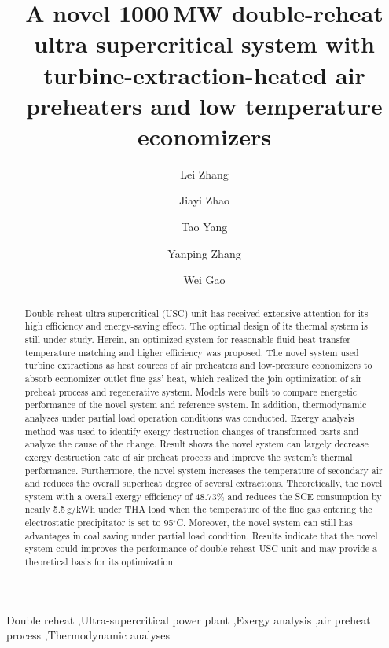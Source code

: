 \documentclass[preprint,12pt]{elsarticle}
\begin{document}
\begin{frontmatter}



\title{A novel 1000\,MW double-reheat ultra supercritical system with turbine-extraction-heated air preheaters and low temperature economizers}


\author[hust,ncst]{Lei Zhang}
\author[hust]{Jiayi Zhao}
\author[hust]{Tao Yang}
\author[hust]{Yanping Zhang}
\author[hust]{Wei Gao}


\address[hust]{School of Energy and Power Engineering, Huazhong University of Science and Technology, Wuhan 430074,China}
\address[ncst]{College of Metallurgy and Energy, NorthChina University of Science and and Technology, Tangshan 063009,China}

\begin{abstract}%
Double-reheat ultra-supercritical (USC) unit has received extensive attention for its high efficiency and energy-saving effect.
The optimal design of its thermal system is still under study.
Herein, an optimized system for reasonable fluid heat transfer temperature matching and higher efficiency was proposed.
The novel system used turbine extractions as heat sources of air preheaters and low-pressure economizers to absorb economizer outlet flue gas’ heat, which realized the join optimization of air preheat process and regenerative system.
Models were built to compare energetic performance of the novel system and reference system.
In addition, thermodynamic analyses under partial load operation conditions was conducted. 
Exergy analysis method was used to identify exergy destruction changes of transformed parts and analyze the cause of the change.
Result shows the novel system can largely decrease exergy destruction rate of air preheat process and improve the system's thermal performance.
Furthermore, the novel system increases the temperature of secondary air and reduces the overall superheat degree of several extractions.
Theoretically, the novel system with a overall exergy efficiency of 48.73\%  and reduces the SCE consumption by nearly 5.5\,g/kWh under THA load when the temperature of the flue gas entering the electrostatic precipitator is set to 95$^\circ$C.
Moreover, the novel system can still has advantages in coal saving under partial load condition.
Results indicate that the novel system could improves the performance of double-reheat USC unit and may provide a theoretical basis for its optimization.

\end{abstract}

\begin{keyword}
Double reheat \sep Ultra-supercritical power plant \sep Exergy analysis \sep air preheat process \sep Thermodynamic analyses
\end{keyword}

\end{frontmatter}
\end{document}
